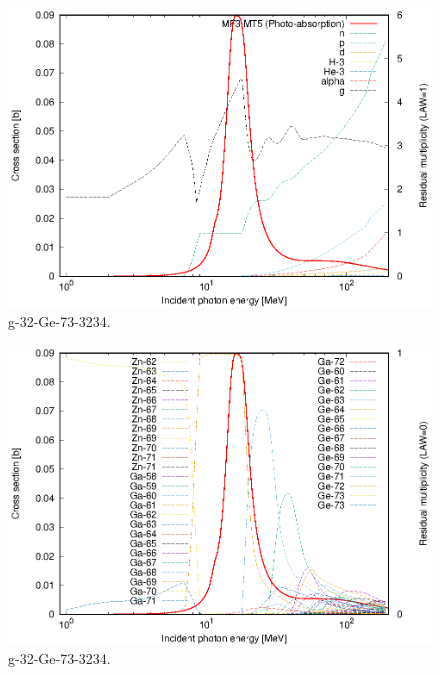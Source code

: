 \begin{figure}
 \includegraphics[width=\linewidth]{eps/g_32-Ge-73_3234.eps}
  \caption{g-32-Ge-73-3234.}
\end{figure}
\begin{figure}
 \includegraphics[width=\linewidth]{eps-law0/g_32-Ge-73_3234.eps}
 \caption{g-32-Ge-73-3234.}
\end{figure}
\newpage \clearpage

